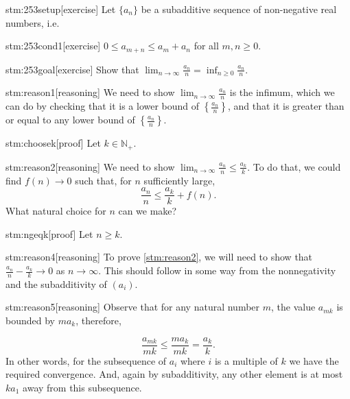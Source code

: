 
\begin{stm}{stm:253setup}[exercise]
Let $\{a_n\}$ be a subadditive sequence of non-negative real numbers, i.e.
\end{stm}

\begin{stm}{stm:253cond1}[exercise]
$0 \le a_{m+n} \le a_m + a_n$ for all $m,n \ge 0$.
\end{stm}

\begin{stm}{stm:253goal}[exercise]
Show that $\lim_{n \to \infty} \frac{a_n}{n} = \inf_{n \ge 0} \frac{a_n}{n}$.
\end{stm}


\begin{stm}{stm:reason1}[reasoning]
We need to show $\lim_{n \to \infty} \frac{a_n}{n}$ is the infimum, which we can do by checking that it is a lower bound of $\left\{ \frac{a_n}{n} \right\}$, and that it is greater than or equal to any lower bound of $\left\{ \frac{a_n}{n} \right\}$.
\end{stm}

\begin{stm}{stm:choosek}[proof]
Let $k \in \mathbb{N}_+$.
\end{stm}

\begin{stm}{stm:reason2}[reasoning]
We need to show $\lim_{n \to \infty} \frac{a_n}{n} \le \frac{a_k}{k}$. To do that, we could find $f(n) \to 0$ such that, for $n$ sufficiently large, 
\[
\frac{a_n}{n} \le \frac{a_k}{k} + f(n).
\]
What natural choice for $n$ can we make?
\end{stm}

\begin{stm}{stm:ngeqk}[proof]
Let $n \ge k$.
\end{stm}

\begin{stm}{stm:reason4}[reasoning]
To prove \ref{stm:reason2}, we will need to show that $\frac{a_n}{n} - \frac{a_k}{k} \to 0$ as $n \to \infty$. This should follow in some way from the nonnegativity and the subadditivity of $(a_i)$.
\end{stm}

\begin{stm}{stm:reason5}[reasoning]
Observe that for any natural number $m$, the value $a_{mk}$ is bounded by $m a_k$, therefore,

\[
\frac{a_{mk}}{mk} \le \frac{ma_k}{mk} = \frac{a_k}{k}.
\]
In other words, for the subsequence of $a_i$ where $i$ is a multiple of $k$ we have the required convergence. And, again by subadditivity, any other element is at most $k a_1$ away from this subsequence.
\end{stm}

